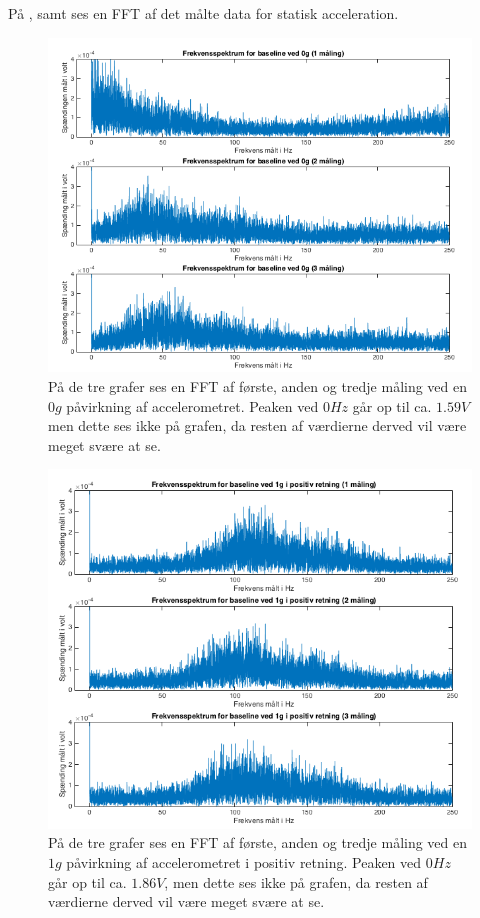 På ,  samt  ses en FFT af det målte data for statisk acceleration.
\begin{figure}[H]
	\centering
	\includegraphics[scale=0.5]{figures/cProblemloesning/Pilotforsoeg_Frekvens0.png}
	\caption{På de tre grafer ses en FFT af første, anden og tredje måling ved en $0g$ påvirkning af accelerometret. Peaken ved $0Hz$ går op til ca. $1.59V$ men dette ses ikke på grafen, da resten af værdierne derved vil være meget svære at se.}
	\label{Fig:Pilot_FFT0}
\end{figure}
\begin{figure}[H]
	\centering
	\includegraphics[scale=0.5]{figures/cProblemloesning/Pilotforsoeg_FrekvensP.png}
	\caption{På de tre grafer ses en FFT af første, anden og tredje måling ved en $1g$ påvirkning af accelerometret i positiv retning. Peaken ved $0Hz$ går op til ca. $1.86V$, men dette ses ikke på grafen, da resten af værdierne derved vil være meget svære at se.}
	\label{Fig:Pilot_FFTP}
\end{figure}
